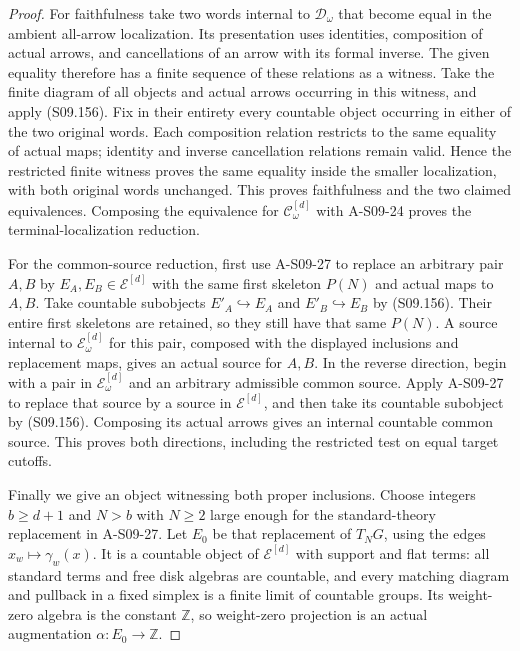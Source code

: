 \begin{proof}
For faithfulness take two words internal to $\mathcal D_\omega$
that become equal in the ambient all-arrow localization. Its
presentation uses identities, composition of actual arrows,
and cancellations of an arrow with its formal inverse. The
given equality therefore has a finite sequence of these
relations as a witness. Take the finite diagram of all objects
and actual arrows occurring in this witness, and apply (S09.156).
Fix in their entirety every countable object occurring in either
of the two original words. Each composition relation restricts
to the same equality of actual maps; identity and inverse
cancellation relations remain valid. Hence the restricted
finite witness proves the same equality inside the smaller
localization, with both original words unchanged. This proves
faithfulness and the two claimed equivalences. Composing the
equivalence for $\mathcal C^{[d]}_\omega$ with A-S09-24 proves
the terminal-localization reduction.

For the common-source reduction, first use A-S09-27 to replace
an arbitrary pair $A,B$ by $E_A,E_B\in\mathcal E^{[d]}$ with
the same first skeleton $P(N)$ and actual maps to $A,B$.
Take countable subobjects $E'_A\hookrightarrow E_A$ and
$E'_B\hookrightarrow E_B$ by (S09.156). Their entire first
skeletons are retained, so they still have that same $P(N)$.
A source internal to $\mathcal E^{[d]}_\omega$ for this pair,
composed with the displayed inclusions and replacement maps,
gives an actual source for $A,B$. In the reverse direction,
begin with a pair in $\mathcal E^{[d]}_\omega$ and an arbitrary
admissible common source. Apply A-S09-27 to replace that source
by a source in $\mathcal E^{[d]}$, and then take its countable
subobject by (S09.156). Composing its actual arrows gives an
internal countable common source. This proves both directions,
including the restricted test on equal target cutoffs.

Finally we give an object witnessing both proper inclusions.
Choose integers $b\geq d+1$ and $N>b$ with $N\geq2$ large
enough for the standard-theory replacement in A-S09-27.
Let $E_0$ be that replacement of $T_NG$, using the edges
$x_w\mapsto\gamma_w(x)$. It is a countable object of
$\mathcal E^{[d]}$ with support and flat terms: all standard
terms and free disk algebras are countable, and every matching
diagram and pullback in a fixed simplex is a finite limit of
countable groups. Its weight-zero algebra is the constant
$\mathbb Z$, so weight-zero projection is an actual augmentation
$\alpha:E_0\to\mathbb Z$.


\end{proof}
